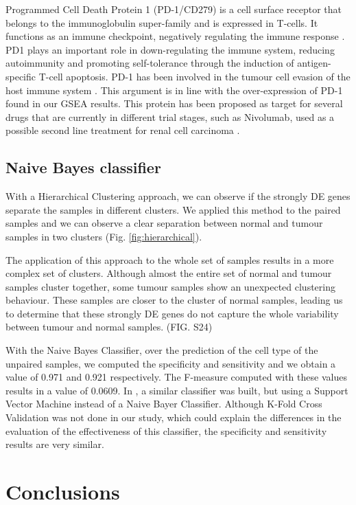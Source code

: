 \documentclass[9pt,twocolumn,twoside]{gsajnl}
\begin{document}
Programmed Cell Death Protein 1 (PD-1/CD279) is a cell surface receptor that belongs to the immunoglobulin super-family and is expressed in T-cells. It functions as an immune checkpoint, negatively regulating the immune response \citep{Francisco2010}. PD1 plays an important role in down-regulating the immune system, reducing autoimmunity and promoting self-tolerance through the induction of antigen-specific T-cell apoptosis.
PD-1 has been involved in the tumour cell evasion of the host immune system \citep{Iwai2002}. This argument is in line with the over-expression of PD-1 found in our GSEA results. This protein has been proposed as target for several drugs that are currently in different trial stages, such as Nivolumab, used as a possible second line treatment for renal cell carcinoma \citep{nivolumab}.


\subsection*{Naive Bayes classifier}
With a Hierarchical Clustering approach, we can observe if the strongly DE genes separate the samples in different clusters. We applied this method to the paired samples and we can observe a clear separation between normal and tumour samples in two clusters (Fig. \ref{fig:hierarchical}). 

The application of this approach to the whole set of samples results in a more complex set of clusters. Although almost the entire set of normal and tumour samples cluster together, some tumour samples show an unexpected clustering behaviour. These samples are closer to the cluster of normal samples, leading us to determine that these strongly DE genes do not capture the whole variability between tumour and normal samples. (FIG. S24)


With the Naive Bayes Classifier, over the prediction of the cell type of the unpaired samples, we computed the specificity and sensitivity and we obtain a value of 0.971 and 0.921 respectively. The F-measure computed with these values results in a value of 0.0609. In  \citealt{Yang2014} , a similar classifier was built, but using a Support Vector Machine instead of a Naive Bayer Classifier. Although K-Fold Cross Validation was not done in our study, which could explain the differences in the evaluation of the effectiveness of this classifier, the specificity and sensitivity results are very similar.

\section*{Conclusions}
\end{document}
